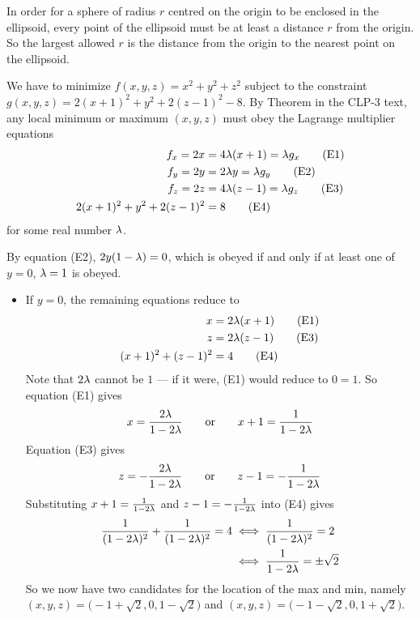 \begin{solution}
 In order for a sphere of radius $r$ centred on the origin 
to be enclosed in the ellipsoid, every point of the ellipsoid must 
be at least a distance $r$ from the origin. So the largest 
allowed $r$ is the distance from the origin to the nearest point 
on the ellipsoid. 

We have to minimize $f(x,y,z)=x^2+y^2+z^2$ subject to the constraint 
$g(x,y,z) = 2(x+1)^2 + y^2 + 2(z-1)^2 -8$.
By Theorem  in the CLP-3 text, any local minimum
or maximum $(x,y,z)$ must obey the  Lagrange multiplier equations
\begin{align*}
f_x = 2x &=4 \lambda (x+1) = \lambda g_x \tag{E1} \\ 
f_y = 2y &=2 \lambda y = \lambda g_y \tag{E2} \\ 
f_z = 2z &=4 \lambda (z-1) = \lambda g_z \tag{E3} \\ 
2(x+1)^2 + y^2 + 2(z-1)^2 &= 8 \tag{E4}
\end{align*}
for some real number $\lambda$.

By equation (E2), $2y(1-\lambda)=0$, which is
obeyed if and only if at least one of $y=0$, $\lambda=1$ is obeyed.
\begin{itemize}
\item 
If $y=0$, the remaining equations reduce to
\begin{align*}
x &=2 \lambda (x+1)  \tag{E1} \\ 
z &=2 \lambda (z-1) \tag{E3} \\ 
(x+1)^2 + (z-1)^2 &= 4 \tag{E4}
\end{align*}
Note that $2\lambda$ cannot be $1$ --- if it were, (E1) would reduce to $0=1$.
So equation (E1) gives
\begin{align*}
x = \frac{2\lambda}{1-2\lambda}\qquad\text{or}\qquad
x+1 = \frac{1}{1-2\lambda}
\end{align*}
Equation (E3) gives
\begin{align*}
z = -\frac{2\lambda}{1-2\lambda}\qquad\text{or}\qquad
z-1 = -\frac{1}{1-2\lambda}
\end{align*}
Substituting $x+1 = \frac{1}{1-2\lambda}$ and $z-1 = -\frac{1}{1-2\lambda}$ into (E4)
gives
\begin{align*}
\frac{1}{(1-2\lambda)^2} +  \frac{1}{(1-2\lambda)^2} =4
&\iff \frac{1}{(1-2\lambda)^2} = 2 \\
&\iff \frac{1}{1-2\lambda} =\pm\sqrt{2}
\end{align*}
So we now have two candidates for the location of the max and min,
namely 
$(x,y,z) = \big(-1 + \sqrt{2}, 0, 1-\sqrt{2}\big)$ and 
$(x,y,z) = \big(-1 - \sqrt{2}, 0, 1+\sqrt{2}\big)$.


\end{itemize}
\end{solution}

